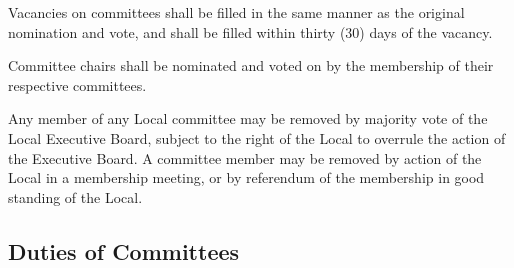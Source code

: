 \documentclass[12pt]{article}
\begin{document}
Vacancies on committees shall be filled in the same manner as the original nomination and vote, and shall be filled within thirty (30) days of the vacancy.

Committee chairs shall be nominated and voted on by the membership of their respective committees.

Any member of any Local committee may be removed by majority vote of the Local Executive Board, subject to the right of the Local to overrule the action of the Executive Board. A committee member may be removed by action of the Local in a membership meeting, or by referendum of the membership in good standing of the Local.

\subsection{Duties of Committees}\label{duties-of-committees}
\end{document}
